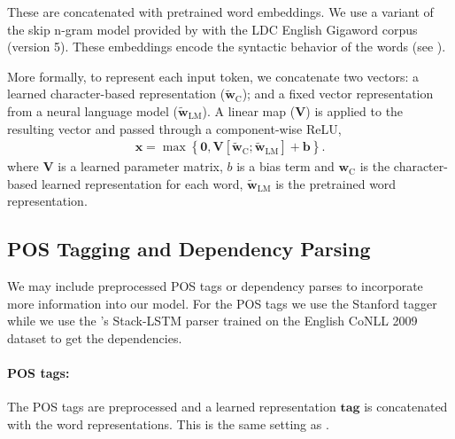 \documentclass[11pt,a4paper]{article}
\begin{document}
 These are concatenated with pretrained word  embeddings. We use a variant of the skip n-gram model 
 provided by   with the LDC English Gigaword corpus (version 5). 
 These embeddings encode the syntactic behavior of the words (see 
 \cite{Ling:2015:naacl}).
 
 More formally, to represent each input token, we concatenate two vectors: a learned
 character-based representation ($\tilde{\mathbf{w}}_{\textrm{C}}$); and a 
fixed vector representation from a neural language model ($\tilde{\mathbf{w}}_{\textrm{LM}}$).
A linear map ($\mathbf{V}$) is applied to the resulting vector and passed through a component-wise ReLU,
\begin{align*}
\mathbf{x} = \max\left\{\mathbf{0}, \mathbf{V}[\tilde{\mathbf{w}}_{\textrm{C}}; \tilde{\mathbf{w}}_{\textrm{LM}}]  + \mathbf{b} \right\} .
\end{align*}
where $\mathbf{V}$ is a learned parameter matrix, $b$ is a bias term and ${\mathbf{w}}_{\textrm{C}}$
is the character-based learned representation for each word, $\tilde{\mathbf{w}}_{\textrm{LM}}$ is the 
pretrained word representation.



















  
 \subsection{POS Tagging and Dependency Parsing}
 
 We may include preprocessed POS tags or dependency parses to incorporate more information into our model.  
For the POS tags we use the Stanford tagger \cite{Toutanova:2003:FPT:1073445.1073478} while we use the 
 's Stack-LSTM parser trained on the English CoNLL 2009 
 dataset \cite{Hajic:2009:CST:1596409.1596411} to get the dependencies.
 


 \paragraph{POS tags:} The POS
  tags are preprocessed and a learned representation $\mathbf{tag}$ is concatenated with the word 
  representations. This is the same setting as \cite{lstmacl15}.
\end{document}
